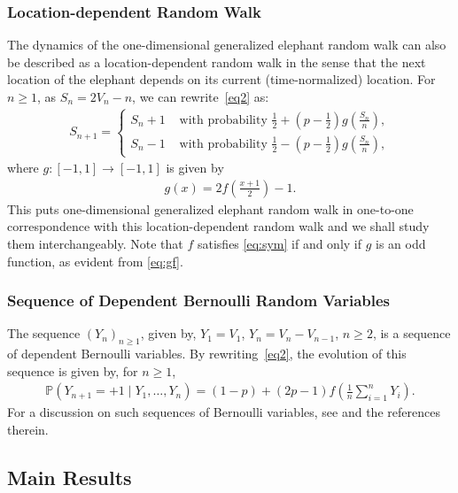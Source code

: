 \documentclass[12pt]{amsart}
\theoremstyle{plain}
\theoremstyle{remark}
\numberwithin{equation}{section}
\begin{document}
\subsubsection{Location-dependent Random Walk}\label{sss:rwre}

The dynamics of the one-dimensional generalized elephant random walk can also be described as a location-dependent random walk in the sense that the next location of the elephant depends on its current (time-normalized) location. For $n \geq 1$, as $S_n = 2V_n - n$, we can rewrite~\eqref{eq2} as: 
\begin{align}\label{eq1}
           S_{n+1} = \begin{cases}
             S_n + 1 &\text{ with probability } \frac{1}{2} + \left(p-\frac{1}{2}\right)g\left({\frac{S_{n}}{n}}\right),\\ 
              S_n - 1 &\text{ with probability } \frac{1}{2} - \left(p-\frac{1}{2}\right)g\left({\frac{S_{n}}{n}}\right),
           \end{cases}
\end{align}
where $g:[-1,1] \to [-1,1]$ is given by \begin{align}\label{eq:gf}g(x) = 2f\left(\frac{x+1}{2}\right) - 1.\end{align} This puts one-dimensional generalized elephant random walk in one-to-one correspondence with this location-dependent random walk and we shall study them interchangeably. Note that $f$ satisfies \eqref{eq:sym} if and only if $g$ is an odd function, as evident from \eqref{eq:gf}. %

\subsubsection{Sequence of Dependent Bernoulli Random Variables}\label{subsec:bernoulli}

The sequence $\left(Y_n\right)_{n\geq 1}$, given by, $Y_1 = V_1$, $Y_n = V_n - V_{n-1}$, $n \geq 2$, is a sequence of dependent Bernoulli variables. By rewriting~\eqref{eq2}, the evolution of this sequence is given by, for $n \geq 1$,
\begin{align*}\mathbb{P}\left(Y_{n+1} = +1 \mid Y_1, \ldots, Y_n \right) = (1-p) + (2p-1)f\left({\frac{1}{n}}\sum_{i=1}^n Y_i\right).\end{align*}
For a discussion on such sequences of Bernoulli variables, see \cite{wu2012asymptotics} and the references therein.

\subsection{Main Results}\label{subsec:results-ldrw}
\end{document}
